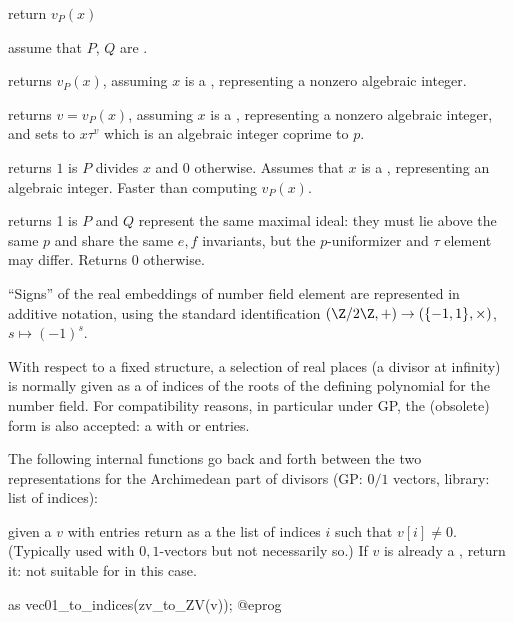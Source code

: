 
 return $v_P(x)$

 assume that $P$, $Q$ are .

 returns $v_P(x)$,
assuming $x$ is a , representing a nonzero algebraic integer.

 returns $v = v_P(x)$,
assuming $x$ is a , representing a nonzero algebraic integer, and sets
 to $x\tau^v$ which is an algebraic integer coprime to $p$.

 returns $1$ is $P$ divides $x$ and
$0$ otherwise. Assumes that $x$ is a , representing an algebraic
integer. Faster than computing $v_P(x)$.

 returns 1 is $P$ and $Q$ represent
the same maximal ideal: they must lie above the same $p$ and share the same
$e,f$ invariants, but the $p$-uniformizer and $\tau$ element may differ.
Returns $0$ otherwise.

\label{se:signatures}

``Signs'' of the real embeddings of number field element are represented in
additive notation, using the standard identification $(\Z/2\Z, +) \to
(\{-1,1\},\times)$, $s\mapsto (-1)^s$.

With respect to a fixed  structure, a selection of real places (a
divisor at infinity) is normally given as a  of indices of the
roots  of the defining polynomial for the number field. For
compatibility reasons, in particular under GP, the (obsolete) 
form is also accepted: a  with  or  entries.

The following internal functions go back and forth between the two
representations for the Archimedean part of divisors (GP: $0/1$ vectors,
library: list of indices):

 given a  $v$ with  entries
return as a  the list of indices $i$ such that $v[i] \neq 0$.
(Typically used with $0,1$-vectors but not necessarily so.) If $v$ is already
a , return it: not suitable for  in this case.

 as
\bprog
  vec01_to_indices(zv_to_ZV(v));
@eprog

